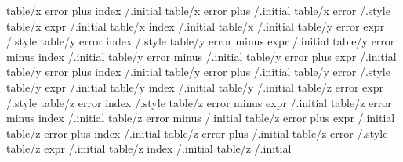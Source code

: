 table/x error plus index                                                        /.initial     
table/x error plus                                                              /.initial     
table/x error                                                                   /.style       
table/x expr                                                                    /.initial     
table/x index                                                                   /.initial     
table/x                                                                         /.initial     
table/y error expr                                                              /.style       
table/y error index                                                             /.style       
table/y error minus expr                                                        /.initial     
table/y error minus index                                                       /.initial     
table/y error minus                                                             /.initial     
table/y error plus expr                                                         /.initial     
table/y error plus index                                                        /.initial     
table/y error plus                                                              /.initial     
table/y error                                                                   /.style       
table/y expr                                                                    /.initial     
table/y index                                                                   /.initial     
table/y                                                                         /.initial     
table/z error expr                                                              /.style       
table/z error index                                                             /.style       
table/z error minus expr                                                        /.initial     
table/z error minus index                                                       /.initial     
table/z error minus                                                             /.initial     
table/z error plus expr                                                         /.initial     
table/z error plus index                                                        /.initial     
table/z error plus                                                              /.initial     
table/z error                                                                   /.style       
table/z expr                                                                    /.initial     
table/z index                                                                   /.initial     
table/z                                                                         /.initial     

